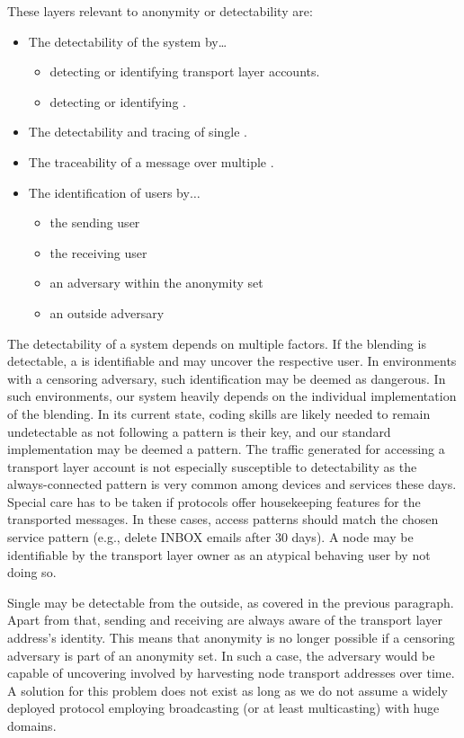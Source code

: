 These layers relevant to anonymity or detectability are:
\begin{itemize}
	\item The detectability of the system by\ldots
	\begin{itemize}
		\item detecting or identifying transport layer accounts.
		\item detecting or identifying \VortexNodes{}.
	\end{itemize}
	\item The detectability and tracing of single \VortexMessages.
	\item The traceability of a message over multiple \VortexNodes{}.
	\item The identification of \MessageVortex{} users by$\ldots$
	\begin{itemize}
		\item the sending \MessageVortex{} user
		\item the receiving \MessageVortex{} user
		\item an adversary within the anonymity set
		\item an outside adversary
	\end{itemize}
\end{itemize} 

The detectability of a system depends on multiple factors. If the blending is detectable, a \VortexNode{} is identifiable and may uncover the respective user. In environments with a censoring adversary, such identification may be deemed as dangerous. In such environments, our system heavily depends on the individual implementation of the blending. In its current state, coding skills are likely needed to remain undetectable as not following a pattern is their key, and our standard implementation may be deemed a pattern. The traffic generated for accessing a transport layer account is not especially susceptible to detectability as the always-connected pattern is very common among devices and services these days. Special care has to be taken if protocols offer housekeeping features for the transported messages. In these cases, access patterns should match the chosen service pattern (e.g., delete INBOX emails after 30 days). A node may be identifiable by the transport layer owner as an atypical behaving user by not doing so.

Single \VortexMessages{} may be detectable from the outside, as covered in the previous paragraph. Apart from that, sending and receiving \VortexNodes{} are always aware of the transport layer address's identity. This means that anonymity is no longer possible if a censoring adversary is part of an anonymity set. In such a case, the adversary would be capable of uncovering involved \VortexNodes{} by harvesting node transport addresses over time. A solution for this problem does not exist as long as we do not assume a widely deployed protocol employing broadcasting (or at least multicasting) with huge domains.

